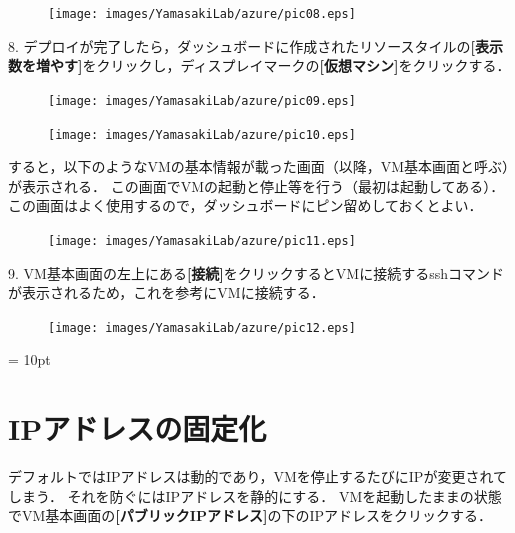 \begin{figure}[ht]
	\begin{center}
		\texttt{[image: images/YamasakiLab/azure/pic08.eps]}
	\end{center}
\end{figure}

\newpage

8. デプロイが完了したら，ダッシュボードに作成されたリソースタイルの{\bf[表示数を増やす]}をクリックし，ディスプレイマークの{\bf[仮想マシン]}をクリックする．

\begin{figure}[ht]
	\begin{center}
		\texttt{[image: images/YamasakiLab/azure/pic09.eps]}
	\end{center}
\end{figure}

\begin{figure}[ht]
	\begin{center}
		\texttt{[image: images/YamasakiLab/azure/pic10.eps]}
	\end{center}
\end{figure}


すると，以下のようなVMの基本情報が載った画面（以降，VM基本画面と呼ぶ）が表示される．
この画面でVMの起動と停止等を行う（最初は起動してある）．
この画面はよく使用するので，ダッシュボードにピン留めしておくとよい．

\begin{figure}[ht]
	\begin{center}
		\texttt{[image: images/YamasakiLab/azure/pic11.eps]}
	\end{center}
\end{figure}

\newpage

9. VM基本画面の左上にある{\bf[接続]}をクリックするとVMに接続するsshコマンドが表示されるため，これを参考にVMに接続する．

\begin{figure}[ht]
	\begin{center}
		\texttt{[image: images/YamasakiLab/azure/pic12.eps]}
	\end{center}
\end{figure}

\parindent = 10pt

\section*{IPアドレスの固定化}
デフォルトではIPアドレスは動的であり，VMを停止するたびにIPが変更されてしまう．
それを防ぐにはIPアドレスを静的にする．
VMを起動したままの状態でVM基本画面の{\bf[パブリックIPアドレス]}の下のIPアドレスをクリックする．

